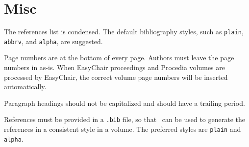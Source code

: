 \documentclass[a4paper]{easychair}
\begin{document}
\section{Misc}
\label{se:misc}

The references list is condensed. The default bibliography styles, such as
\texttt{plain}, \texttt{abbrv}, and \texttt{alpha}, are suggested.

Page numbers are at the bottom of every page. Authors must leave the
page numbers in as-is. When EasyChair proceedings and Procedia volumes are processed by
EasyChair, the correct volume page numbers will be inserted
automatically.

Paragraph headings should not be capitalized and should have a
trailing period. 

References must be provided in a {\tt .bib} file, so that \BibTeX\ can
be used to generate the references in a consistent style in a volume.
The preferred styles are {\tt plain} and {\tt alpha}.


%
%
%


\iffalse
\appendix
\section{Appendix}
\label{se:appendix}

The text should look good on both A4 and letter paper.
\fi

\end{document}
